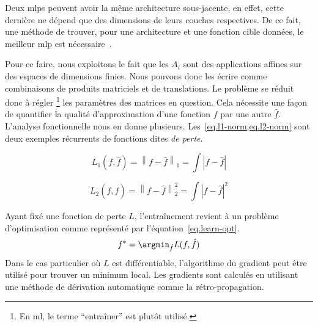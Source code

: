Deux \glspl{mlp} peuvent avoir la même architecture sous-jacente,
en effet, cette dernière ne dépend que des dimensions de leurs couches respectives.
De ce fait, une méthode de trouver, pour une architecture et une fonction cible données,
le meilleur \gls{mlp} est nécessaire~\cite{Mukherjee_2021}.

Pour ce faire, nous exploitons le fait que 
les \(A_i\) sont des applications affines sur des espaces de dimensions finies.
Nous pouvons donc les écrire comme combinaisons de produits matriciels et de translations.
Le problème se réduit donc à régler \footnote{En \gls{ml}, le terme ``entraîner'' est plutôt utilisé.}
les paramètres des matrices en question. 
Cela nécessite une façon de quantifier la qualité d'approximation d'une fonction \(f\) par une autre \(\hat{f}\).
L'analyse fonctionnelle nous en donne plusieurs. 
Les~\cref{eq.l1-norm,eq.l2-norm} sont deux exemples récurrents de fonctions dites \emph{de perte}.

\begin{equation}
    \label{eq.l1-norm}
    L_1(f, \hat{f}) = \left\|f - \hat{f}\right\|_1 = \int \left|f - \hat{f}\right|
\end{equation}

\begin{equation}
    \label{eq.l2-norm}
    L_2(f, \hat{f}) = \left\|f - \hat{f}\right\|_2^2 = \int \left|f - \hat{f}\right|^2
\end{equation}

Ayant fixé une fonction de perte \(L\), 
l'entraînement revient à un problème d'optimisation comme représenté par l'équation~\ref{eq.learn-opt}.
\begin{equation}
    \label{eq.learn-opt}
    f^\ast = \argmin_{\hat{f}}{L(f, \hat{f})}
\end{equation}
Dans le cas particulier où \(L\) est différentiable, 
l'algorithme du gradient peut être utilisé pour trouver un minimum local.
Les gradients sont calculés en utilisant une méthode de dérivation automatique comme la rétro-propagation.
